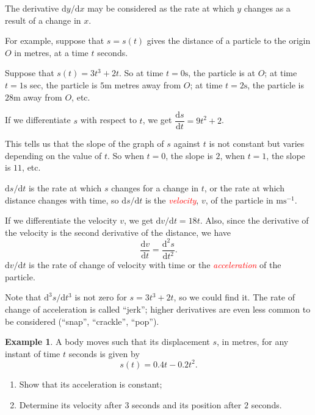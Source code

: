 \documentclass[
  11pt,
  oneside]{book}
\providecommand{\tightlist}{%
  \setlength{\itemsep}{0pt}\setlength{\parskip}{0pt}}
\newcommand{\slide}{}
\theoremstyle{definition}
\theoremstyle{definition}
\newtheorem{example}{Example}[chapter]
\theoremstyle{definition}
\theoremstyle{definition}
\theoremstyle{remark}
\begin{document}
The derivative \(\mathrm{d}y/\mathrm{d} x\) may be considered as the rate at which \(y\) changes as a result of a change in \(x\).

For example, suppose that \(s=s(t)\) gives the distance of a particle to the origin \(O\) in metres, at a time \(t\) seconds.

Suppose that \(s(t) = 3t^3 + 2t\). So at time \(t = 0\text{s}\), the particle is at \(O\); at time \(t = 1\text{s}\) sec, the particle is \(5\text{m}\) metres away from \(O\); at time \(t = 2\text{s}\), the particle is \(28\text{m}\) away from \(O\), etc.

If we differentiate \(s\) with respect to \(t\), we get \(\dfrac{\mathrm{d} s}{\mathrm{d} t} = 9t^2 + 2\).

This tells us that the slope of the graph of \(s\) against \(t\) is not constant but varies depending on the value of \(t\). So when \(t = 0\), the slope is \(2\), when \(t = 1\), the slope is \(11\), etc.
\slide

\(\mathrm{d} s/\mathrm{d} t\) is the rate at which \(s\) changes for a change in \(t\), or the rate at which distance changes with time, so \(\mathrm{d} s/\mathrm{d} t\) is the \textcolor{red}{\em velocity}, \(v\), of the particle in \(\text{m}\text{s}^{-1}\).

If we differentiate the velocity \(v\), we get \(\mathrm{d} v/\mathrm{d} t = 18t\). Also, since the derivative of the velocity is the second derivative of the distance, we have
\[
\frac{\mathrm{d} v}{\mathrm{d} t}= \frac{\mathrm{d}^{2}s}{\mathrm{d}t^2}.
\]
\(\mathrm{d} v/\mathrm{d} t\) is the rate of change of velocity with time or the \textcolor{red}{\em acceleration} of the particle.

Note that \(\mathrm{d}^{3}s/\mathrm{d} t^{3}\) is not zero for \(s = 3t^3 + 2t\), so we could find it. The rate of change of acceleration is called ``jerk''; higher derivatives are even less common to be considered (``snap'', ``crackle'', ``pop'').
\slide

\begin{example}

A body moves such that its displacement \(s\), in metres, for any instant of time \(t\) seconds is given by
\[
s(t) = 0.4t-0.2t^2.
\]

\begin{enumerate}
\def\labelenumi{\arabic{enumi}.}
\tightlist
\item
  Show that its acceleration is constant;
\item
  Determine its velocity after \(3\) seconds and its position after \(2\) seconds.
\end{enumerate}

\end{example}
\end{document}
